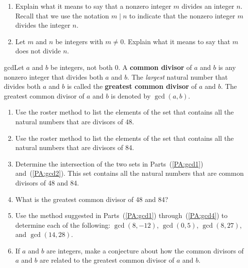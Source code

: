 \begin{previewactivity} \label{PA:gcd} \hfill
\begin{enumerate}
  \item Explain what it means to say that a nonzero integer  $m$  divides an integer $n$.  Recall that we use the notation  $m \mid n$  to indicate that the nonzero integer  $m$  divides the integer  $n$.

\item Let  $m$  and  $n$  be integers with $m \ne 0$.  Explain what it means to say that  $m$  does not divide  $n$.
\end{enumerate}
\begin{defbox}{gcd}{Let  $a$  and  $b$  be integers, not both 0. A \textbf{common divisor}
%
 of  $a$  and  $b$  is any nonzero integer that divides both  $a$  and  $b$.  The \emph{largest} natural number that divides both  $a$  and  $b$  is called the \textbf{greatest common divisor}
%
  of  $a$  and  $b$.  The greatest common divisor of  $a$  and  $b$  is denoted by  $\gcd \left( {a, b} \right)$.
\label{sym:gcd}}
\end{defbox}

\setcounter{oldenumi}{\theenumi}
\begin{enumerate} \setcounter{enumi}{\theoldenumi}

\item Use the roster method to list the elements of the set that contains all the natural numbers that are divisors of 48. \label{PA:gcd1}

\item Use the roster method to list the elements of the set that contains all the natural numbers that are divisors of 84. \label{PA:gcd2}

\item Determine the intersection of the two sets in Parts~(\ref{PA:gcd1}) and~(\ref{PA:gcd2}).  This set contains all the natural numbers that are common divisors of  48  and  84. 

\item What is the greatest common divisor of  48  and  84?  
\label{PA:gcd4}%

\item Use the method suggested in Parts~(\ref{PA:gcd1}) through~(\ref{PA:gcd4}) to determine each of the following:  $\gcd( {8,  - 12}) $, 
$\gcd( {0, 5} )$, $\gcd( {8, 27} )$, and $\gcd( {14, 28})$.  
\label{PA:gcd5}%

\item If $a$ and $b$ are integers, make a conjecture about how the common divisors of  $a$  and  $b$  are related to the greatest common divisor of  $a$  and  $b$.
\end{enumerate}
\end{previewactivity}
\hbreak

\endinput
